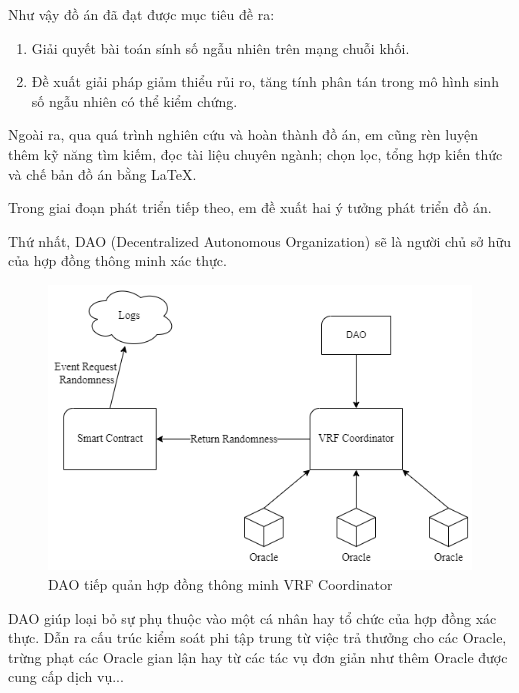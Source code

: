 \documentclass[../main.tex]{subfiles}
\begin{document}
Như vậy đồ án đã đạt được mục tiêu đề ra:
\begin{enumerate}
    \item Giải quyết bài toán sính số ngẫu nhiên trên mạng chuỗi khối.
    \item Đề xuất giải pháp giảm thiểu rủi ro, tăng tính phân tán trong mô hình sinh số ngẫu nhiên có thể kiểm chứng. 
\end{enumerate}
Ngoài ra, qua quá trình nghiên cứu và hoàn thành đồ án, em cũng rèn luyện thêm kỹ năng tìm kiếm, đọc tài liệu chuyên ngành; chọn lọc, tổng hợp kiến thức và chế bản đồ án bằng \LaTeX.

Trong giai đoạn phát triển tiếp theo, em đề xuất hai ý tưởng phát triển đồ án. 

Thứ nhất, DAO (Decentralized Autonomous Organization) sẽ là người chủ sở hữu của hợp đồng thông minh xác thực.

\begin{figure}[h!]
    \centering
    \includegraphics[scale = 0.5]{Figure/DAO.png}
    \caption{DAO tiếp quản hợp đồng thông minh VRF Coordinator}
    \label{fig:DAO}
\end{figure}

DAO giúp loại bỏ sự phụ thuộc vào một cá nhân hay tổ chức của hợp đồng xác thực. Dẫn ra cấu trúc kiểm soát phi tập trung từ việc trả thưởng cho các Oracle, trừng phạt các Oracle gian lận hay từ các tác vụ đơn giản như thêm Oracle được cung cấp dịch vụ... 
\end{document}
